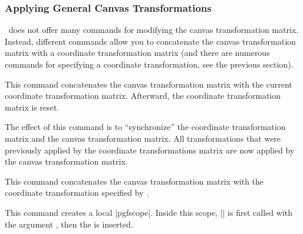 \subsubsection{Applying General Canvas Transformations}

\pgfname\ does not offer many commands for modifying the canvas transformation
matrix. Instead, different commands allow you to concatenate the canvas
transformation matrix with a coordinate transformation matrix (and there are
numerous commands for specifying a coordinate transformation, see the previous
section).

\begin{command}{\pgflowlevelsynccm}
    This command concatenates the canvas transformation matrix with the current
    coordinate transformation matrix. Afterward, the coordinate transformation
    matrix is reset.

    The effect of this command is to ``synchronize'' the coordinate
    transformation matrix and the canvas transformation matrix. All
    transformations that were previously applied by the coordinate
    transformations matrix are now applied by the canvas transformation matrix.
\begin{codeexample}[]
\end{codeexample}
\end{command}

\begin{command}{\pgflowlevel{}}
    This command concatenates the canvas transformation matrix with the
    coordinate transformation specified by .
\begin{codeexample}[]
\end{codeexample}
\end{command}

\begin{command}{\pgflowlevelobj{}}
    This command creates a local |{pgfscope}|. Inside this scope,
    |\pgflowlevel| is first called with the argument , then the  is inserted.
\begin{codeexample}[]
\end{codeexample}
\end{command}

